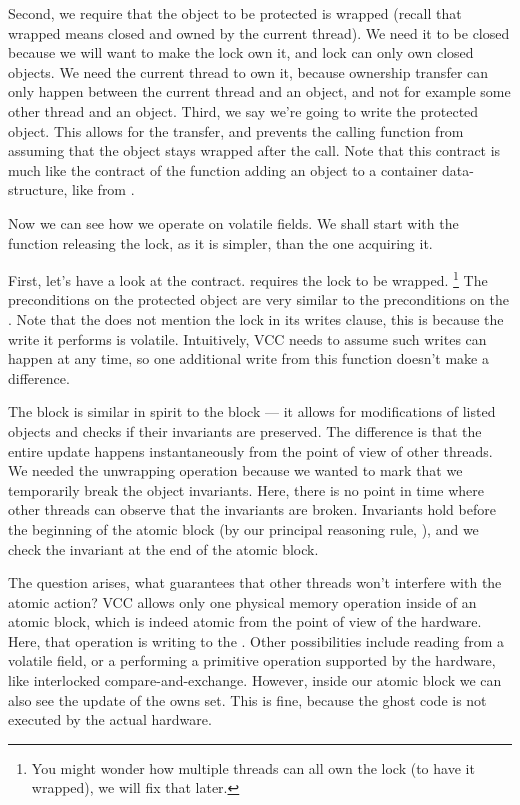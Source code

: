 Second, we require that the object to be protected is wrapped (recall that wrapped means closed
and owned by the current thread).
We need it to be closed because we will want to make the lock own it, and
lock can only own closed objects.
We need the current thread to own it, because ownership transfer can
only happen between the current thread and an object,
and not for example some other thread and an object.
Third, we say we're going to write the protected object.
This allows for the transfer, and prevents the calling function from assuming
that the object stays wrapped after the call.
Note that this contract is much like the contract of the function
adding an object to a container data-structure, like
 from .

Now we can see how we operate on volatile fields.
We shall start with the function releasing the lock, as it is simpler,
than the one acquiring it.


\noindent
First, let's have a look at the contract.
 requires the lock to be wrapped.%
\footnote{ You might wonder how multiple threads can all own the lock (to have it
wrapped), we will fix that later. }
The preconditions on the protected object are very similar to the
preconditions on the .
Note that the  does not mention the lock in its writes clause,
this is because the write it performs is volatile.
Intuitively, VCC needs to assume such writes can happen at any time, so one additional
write from this function doesn't make a difference.

The  block is similar in spirit to the  block ---
it allows for modifications of listed objects and checks if their invariants
are preserved.
The difference is that the entire update happens instantaneously from the point
of view of other threads.
We needed the unwrapping operation because we wanted to mark that we temporarily
break the object invariants.
Here, there is no point in time where other threads can observe that the invariants
are broken.
Invariants hold before the beginning of the atomic block (by our principal reasoning
rule, ), and we check the invariant at the end of the atomic block.

The question arises, what guarantees that other threads won't interfere with the atomic
action?
VCC allows only one physical memory operation inside of an atomic block,
which is indeed atomic from the point of view of the hardware.
Here, that operation is writing to the .
Other possibilities include reading from a volatile field, or a performing
a primitive operation supported by the hardware, like interlocked
compare-and-exchange.
However, inside our atomic block we can also see the update of the owns set.
This is fine, because the ghost code is not executed by the actual hardware.

